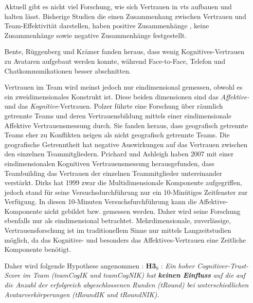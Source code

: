 \documentclass[a4paper,11pt]{article}%
\renewcommand{\\}{\vspace*{0.5\baselineskip} \newline}
\begin{document}
Aktuell gibt es nicht viel Forschung, wie sich Vertrauen in \ac{vts} aufbauen und halten lässt. \citep[p.8-23]{duarte2006mastering} 
Bisherige Studien die einen Zusammenhang zwischen Vertrauen und Team-Effektivität darstellen, haben positive Zusammenhänge \citep{davis2000trusted}, keine Zusammenhänge \citep{hertel2004managing} sowie negative Zusammenhänge \citep{dirks1999effects} festgestellt.

Bente, Rüggenberg und Krämer fanden heraus, dass wenig Kognitives-Vertrauen zu Avataren aufgebaut werden konnte, während Face-to-Face, Telefon und Chatkommunikationen besser abschnitten. \citep[p.54-59]{bente2004social}

Vertrauen im Team wird meinst jedoch nur eindimensional gemessen, obwohl es ein zweidimensionales Konstrukt ist. Diese beiden dimensionen sind das \textit{Affektive-} und das \textit{Kognitive}-Vertrauen.
Polzer führte eine Forschung über räumlich getrennte Teams und deren Vertrauensbildung mittels einer eindimensionale Affektive Vertrauensmessung durch. Sie fanden heraus, dass geografisch getrennte Teams eher zu Konflikten neigen als nicht geografisch getrennte Teams. Die geografische Getrenntheit hat negative Auswirkungen auf das Vertrauen zwischen den einzelnen Teammitgliedern.  \citep[p.682]{polzer2006extending}
Prichard und Ashleigh haben 2007 mit einer eindimensionalen Kognitiven Vertrauensmessung herausgefunden, dass Teambuilding das Vertrauen der einzelnen Teammitglieder untereinander verstärkt. \citep[p.704]{prichard2007effects}
Dirks hat 1999 zwar die Multidimensionale Komponente aufgegriffen, jedoch stand für seine Versuchsdurchführung nur ein 10-Minütiges Zeitfenster zur Verfügung. In diesen 10-Minuten Versuchsfurchführung kann die Affektive-Komponente nicht gebildet bzw. gemessen werden. \citep[p.445]{mayer1995integrative} Daher wird seine Forschung ebenfalls nur als eindimensional betrachtet.
Mehrdimensionale, zuverlässige, Vertrauensforschung ist im traditionellem Sinne nur mittels Langzeitstudien möglich, da das Kognitive- und besonders das Affektives-Vertrauen eine Zeitliche Komponente benötigt. \citep{jones1998experience}

Daher wird folgende Hypothese angenommen :\\
\textbf{H3$_{0}$} : \textit{Ein hoher Cognitiver-Trust-Score im Team (\ac{teamCogIK} und \ac{teamCogNIK}) hat \textbf{keinen Einfluss} auf die auf die Anzahl der erfolgreich abgeschlossenen Runden (\ac{tRound}) bei unterschiedlichen Avatarverkörperungen (\ac{tRoundIK} und \ac{tRoundNIK}).}
\end{document}
